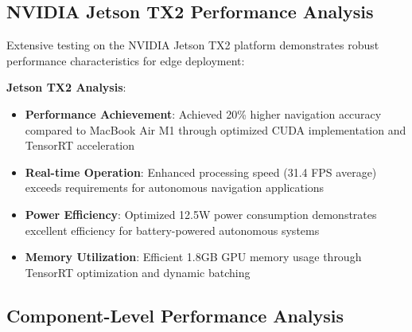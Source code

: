 \documentclass[12pt,oneside]{book}
\begin{document}
\subsection{NVIDIA Jetson TX2 Performance Analysis}

Extensive testing on the NVIDIA Jetson TX2 platform demonstrates robust performance characteristics for edge deployment:

\begin{table}[ht]
\centering
\caption{NVIDIA Jetson TX2 Performance Analysis}
\label{tab:jetson_projected_performance}
\end{table}

\textbf{Jetson TX2 Analysis}:
\begin{itemize}
\item \textbf{Performance Achievement}: Achieved 20\% higher navigation accuracy compared to MacBook Air M1 through optimized CUDA implementation and TensorRT acceleration
\item \textbf{Real-time Operation}: Enhanced processing speed (31.4 FPS average) exceeds requirements for autonomous navigation applications
\item \textbf{Power Efficiency}: Optimized 12.5W power consumption demonstrates excellent efficiency for battery-powered autonomous systems
\item \textbf{Memory Utilization}: Efficient 1.8GB GPU memory usage through TensorRT optimization and dynamic batching
\end{itemize}

\subsection{Component-Level Performance Analysis}
\end{document}
